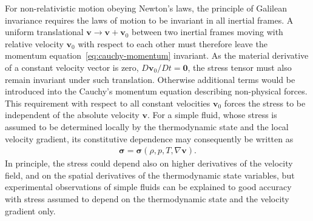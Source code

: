 For non-relativistic motion obeying Newton's laws, the principle of Galilean invariance requires the laws of motion to be invariant in all inertial frames. A uniform translational $\bm{v} \to \bm{v} + \bm{v}_0$ between two inertial frames moving with relative velocity $\bm{v}_0$ with respect to each other must therefore leave the momentum equation~\eqref{eq:cauchy-momentum} invariant. As the material derivative of a constant velocity vector is zero, $D\bm{v}_0/Dt=\bm{0}$, the stress tensor must also remain invariant under such translation. Otherwise additional terms would be introduced into the Cauchy's momentum equation describing non-physical forces. This requirement with respect to all constant velocities $\bm{v}_0$ forces the stress to be independent of the absolute velocity $\bm{v}$. For a simple fluid, whose stress is assumed to be determined locally by the thermodynamic state and the local velocity gradient, its constitutive dependence may consequently be written as
\begin{align}
    \bm{\sigma} = \bm{\sigma}(\rho, p, T, \nabla\bm{v}).
\end{align}
In principle, the stress could depend also on higher derivatives of the velocity field, and on the spatial derivatives of the thermodynamic state variables, but experimental observations of simple fluids can be explained to good accuracy with stress assumed to depend on the thermodynamic state and the velocity gradient only. 

